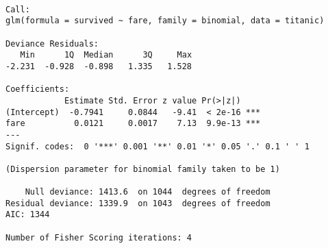 \documentclass{beamer}\usepackage[]{graphicx}\usepackage[]{color}
\makeatletter
\newenvironment{kframe}{%
 \def\at@end@of@kframe{}%
 \ifinner\ifhmode%
  \def\at@end@of@kframe{\end{minipage}}%
  \begin{minipage}{\columnwidth}%
 \fi\fi%
 \def\FrameCommand##1{\hskip\@totalleftmargin \hskip-\fboxsep
 \colorbox{shadecolor}{##1}\hskip-\fboxsep
     \hskip-\linewidth \hskip-\@totalleftmargin \hskip\columnwidth}%
 \MakeFramed {\advance\hsize-\width
   \@totalleftmargin\z@ \linewidth\hsize
   \@setminipage}}%
 {\par\unskip\endMakeFramed%
 \at@end@of@kframe}
\newenvironment{knitrout}{}{} %
\makeatother
\begin{document}
\begin{darkframes}
    \begin{frame}[fragile]
      \fontsize{9}{9}\selectfont
\begin{knitrout}
\begin{kframe}
\begin{verbatim}

Call:
glm(formula = survived ~ fare, family = binomial, data = titanic)

Deviance Residuals: 
   Min      1Q  Median      3Q     Max  
-2.231  -0.928  -0.898   1.335   1.528  

Coefficients:
            Estimate Std. Error z value Pr(>|z|)    
(Intercept)  -0.7941     0.0844   -9.41  < 2e-16 ***
fare          0.0121     0.0017    7.13  9.9e-13 ***
---
Signif. codes:  0 '***' 0.001 '**' 0.01 '*' 0.05 '.' 0.1 ' ' 1

(Dispersion parameter for binomial family taken to be 1)

    Null deviance: 1413.6  on 1044  degrees of freedom
Residual deviance: 1339.9  on 1043  degrees of freedom
AIC: 1344

Number of Fisher Scoring iterations: 4
\end{verbatim}
\end{kframe}
\end{knitrout}
      \lc
    \end{frame}
  \end{darkframes}
\end{document}
